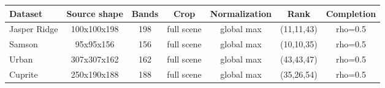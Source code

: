 \begin{tabular}{l c c c c c c}
    \toprule
    Dataset & Source shape & Bands & Crop & Normalization & Rank & Completion \\
    \midrule
    Jasper Ridge & 100x100x198 & 198 & full scene & global max & (11,11,43) & rho=0.5 \\
    Samson & 95x95x156 & 156 & full scene & global max & (10,10,35) & rho=0.5 \\
    Urban & 307x307x162 & 162 & full scene & global max & (43,43,47) & rho=0.5 \\
    Cuprite & 250x190x188 & 188 & full scene & global max & (35,26,54) & rho=0.5 \\
    \bottomrule
\end{tabular}

